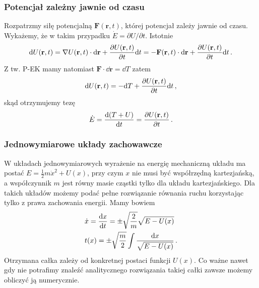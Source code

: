 \documentclass[../main.tex]{subfiles}
\begin{document}
\subsubsection*{Potencjał zależny jawnie od czasu}
Rozpatrzmy siłę potencjalną \(\mathbf{F}(\mathbf{r},t)\), której potencjał zależy jawnie od czasu. Wykażemy, że w takim przypadku \(\dot E=\partial U/\partial t\). Istotnie
\begin{equation*}
    \dd U(\mathbf{r},t)=\nabla U(\mathbf{r},t)\cdot \dd\mathbf{r}+\pdv{U(\mathbf{r},t)}{t}\dd t=-\mathbf{F}(\mathbf{r},t)\cdot \dd\mathbf{r}+\pdv{U(\mathbf{r},t)}{t}\dd t\,.
\end{equation*}
Z tw. P-EK mamy natomiast \(\mathbf{F}\cdot \dd\mathbf{r}=\dd T\) zatem
\begin{equation*}
    \dd U(\mathbf{r},t)=-\dd T+\pdv{U(\mathbf{r},t)}{t}\dd t\,,
\end{equation*}
skąd otrzymujemy tezę
\begin{equation*}
    \dot{E}=\dv{(T+U)}{t}=\pdv{U(\mathbf{r},t)}{t}\,.
\end{equation*}
\subsubsection{Jednowymiarowe układy zachowawcze}
W układach jednowymiarowych wyrażenie na energię mechaniczną układu ma postać \(E=\frac{1}{2}m\dot{x}^2+U(x)\), przy czym \(x\) nie musi być współrzędną kartezjańską, a współczynnik \(m\) jest równy masie cząstki tylko dla układu kartezjańskiego. Dla takich układów możemy podać pełne rozwiązanie równania  ruchu korzystając tylko z prawa zachowania energii. Mamy bowiem
\begin{equation*}
\begin{split}
    &\dot x=\dv{x}{t}=\pm\sqrt{\frac{2}{m}}\sqrt{E-U(x)}\\
    &t(x)=\pm\sqrt{\frac{m}{2}}\int\frac{\dd x}{\sqrt{E-U(x)}}\,.
\end{split}
\end{equation*}
Otrzymana całka zależy od konkretnej postaci funkcji \(U(x)\). Co ważne nawet gdy nie potrafimy znaleźć analitycznego rozwiązania takiej całki zawsze możemy obliczyć ją numerycznie.
\end{document}
